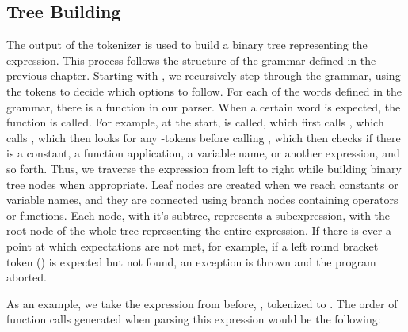 \documentclass[12pt, a4paper]{report}
\begin{document}
\subsection{Tree Building}
The output of the tokenizer is used to build a binary tree representing the expression.
This process follows the structure of the grammar defined in the previous chapter.
Starting with , we recursively step through the grammar, using the tokens to decide which options to follow.
For each of the words defined in the grammar, there is a function in our parser.
When a certain word is expected, the function is called.
For example, at the start,  is called, which first calls , which calls , which then looks for any -tokens before calling , which then checks if there is a constant, a function application, a variable name, or another expression, and so forth.
Thus, we traverse the expression from left to right while building binary tree nodes when appropriate.
Leaf nodes are created when we reach constants or variable names, and they are connected using branch nodes containing operators or functions.
Each node, with it's subtree, represents a subexpression, with the root node of the whole tree representing the entire expression.
If there is ever a point at which expectations are not met, for example, if a left round bracket token () is expected but not found, an exception is thrown and the program aborted.

As an example, we take the expression from before, , tokenized to .
The order of function calls generated when parsing this expression would be the following:
\end{document}

